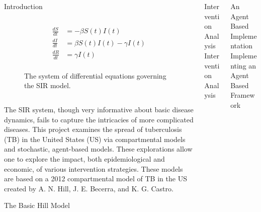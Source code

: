 \documentclass[final]{beamer}
\begin{document}
\begin{frame}
\begin{columns}
\begin{column}{.3\textwidth}
\begin{block}{Introduction}
\begin{block}{}
\begin{column}{.39\textwidth}
\begin{figure}[h]
              \begin{align*}
                \frac{dS}{dt} &= -\beta S(t)I(t) \\
                \frac{dI}{dt} &= \beta S(t)I(t) - \gamma I(t) \\
                \frac{dR}{dt} &= \gamma I(t)\\
              \end{align*}
              \caption{The system of differential equations governing the SIR
                       model.}
              \label{eq:SIRdes}
            \end{figure}
          \end{column}
        \end{block}
        The SIR system, though very informative about basic disease dynamics,
        fails to capture the intricacies of more complicated diseases. This
        project examines the spread of tuberculosis (TB) in the United States
        (US) via compartmental models and stochastic, agent-based models. These
        explorations allow one to explore the impact, both epidemiological and
        economic, of various intervention strategies. These models are based on
        a 2012 compartmental model of TB in the US created by A. N. Hill, J. E.
        Becerra, and K. G. Castro.
      \end{block}
      \begin{block}{The Basic Hill Model}
      \end{block}
    \end{column}
    \begin{column}{.3\textwidth}
      \begin{block}{Intervention Analysis}
        Intervention Analysis
      \end{block}
    \end{column}
    \begin{column}{.3\textwidth}
      \begin{block}{An Agent Based Implementation}
        Implementing an Agent Based Framework
      \end{block}
    \end{column}
  \end{columns}
\end{frame}
\end{document}
